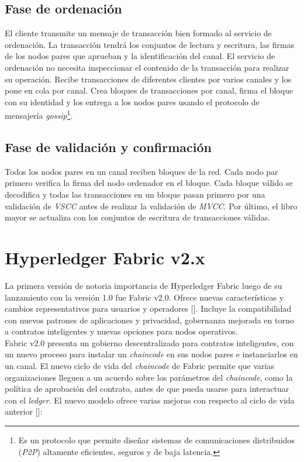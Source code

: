 \subsection{Fase de ordenaci\'on}
El cliente transmite un mensaje de transacci\'on bien formado al servicio de ordenaci\'on. La transacci\'on tendr\'a los conjuntos de lectura y escritura, las firmas de los nodos pares que aprueban y la identificaci\'on del canal. El servicio de ordenaci\'on no necesita inspeccionar el contenido de la transacci\'on para realizar su operaci\'on. Recibe transacciones de diferentes clientes por varios canales y los pone en cola por canal. Crea bloques de transacciones por canal, firma el bloque con su identidad y los entrega a los nodos pares usando el protocolo de mensajer\'ia \emph{gossip}\footnote{Es un protocolo que permite dise\~nar sistemas de comunicaciones distribuidos (\emph{P2P}) altamente eficientes, seguros y de baja latencia.}.

\subsection{Fase de validaci\'on y confirmaci\'on}
Todos los nodos pares en un canal reciben bloques de la red. Cada nodo par primero verifica la firma del nodo ordenador en el bloque. Cada bloque v\'alido se decodifica y todas las transacciones en un bloque pasan primero por una validaci\'on de \emph{VSCC} antes de realizar la validaci\'on de \emph{MVCC}. Por \'ultimo, el libro mayor se actualiza con los conjuntos de escritura de transacciones v\'alidas.

\section{Hyperledger Fabric v2.x}
La primera versi\'on de notoria importancia de Hyperledger Fabric luego de su lanzamiento con la versi\'on 1.0 fue Fabric v2.0. Ofrece nuevas caracter\'isticas y cambios representativos para usuarios y operadores [\cite{NewHF}]. Incluye la compatibilidad con nuevos patrones de aplicaciones y privacidad, gobernanza mejorada en torno a contratos inteligentes y nuevas opciones para nodos operativos.\\

Fabric v2.0 presenta un gobierno descentralizado para contratos inteligentes, con un nuevo proceso para instalar un \emph{chaincode} en sus nodos pares e instanciarlos en un canal. El nuevo ciclo de vida del \emph{chaincode} de Fabric permite que varias organizaciones lleguen a un acuerdo sobre los par\'ametros del \emph{chaincode}, como la pol\'itica de aprobaci\'on del contrato, antes de que pueda usarse para interactuar con el \emph{ledger}. El nuevo modelo ofrece varias mejoras con respecto al ciclo de vida anterior [\cite{hyperledger2018hyperledger}]:

